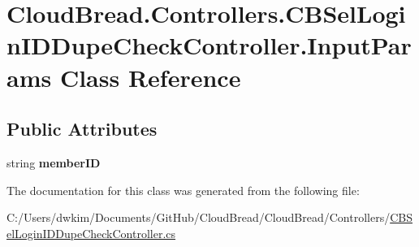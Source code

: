 \hypertarget{class_cloud_bread_1_1_controllers_1_1_c_b_sel_login_i_d_dupe_check_controller_1_1_input_params}{}\section{Cloud\+Bread.\+Controllers.\+C\+B\+Sel\+Login\+I\+D\+Dupe\+Check\+Controller.\+Input\+Params Class Reference}
\label{class_cloud_bread_1_1_controllers_1_1_c_b_sel_login_i_d_dupe_check_controller_1_1_input_params}
\subsection*{Public Attributes}
\begin{DoxyCompactItemize}
\item 
string {\bfseries member\+ID}\hypertarget{class_cloud_bread_1_1_controllers_1_1_c_b_sel_login_i_d_dupe_check_controller_1_1_input_params_a643c0f95adab9043328a75b0da7b3739}{}\label{class_cloud_bread_1_1_controllers_1_1_c_b_sel_login_i_d_dupe_check_controller_1_1_input_params_a643c0f95adab9043328a75b0da7b3739}

\end{DoxyCompactItemize}


The documentation for this class was generated from the following file\+:\begin{DoxyCompactItemize}
\item 
C\+:/\+Users/dwkim/\+Documents/\+Git\+Hub/\+Cloud\+Bread/\+Cloud\+Bread/\+Controllers/\hyperlink{_c_b_sel_login_i_d_dupe_check_controller_8cs}{C\+B\+Sel\+Login\+I\+D\+Dupe\+Check\+Controller.\+cs}\end{DoxyCompactItemize}
